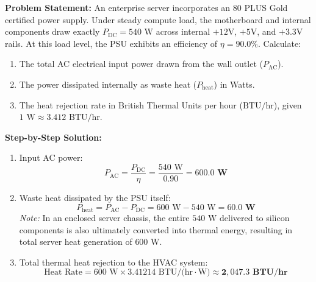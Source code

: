 \begin{tcolorbox}[colback=white,colframe=navyblue,title=\textbf{Problem 10: 80 PLUS PSU Efficiency and Thermal Heat Dissipation}]
\textbf{Problem Statement:} An enterprise server incorporates an 80 PLUS Gold certified power supply. Under steady compute load, the motherboard and internal components draw exactly $P_{\text{DC}} = 540\text{ W}$ across internal $+12\text{V}$, $+5\text{V}$, and $+3.3\text{V}$ rails. At this load level, the PSU exhibits an efficiency of $\eta = 90.0\%$. Calculate:
\begin{enumerate}[label=(\alph*),leftmargin=*]
    \item The total AC electrical input power drawn from the wall outlet ($P_{\text{AC}}$).
    \item The power dissipated internally as waste heat ($P_{\text{heat}}$) in Watts.
    \item The heat rejection rate in British Thermal Units per hour ($\text{BTU/hr}$), given $1\text{ W} \approx 3.412\text{ BTU/hr}$.
\end{enumerate}
\textbf{Step-by-Step Solution:}
\begin{enumerate}[label=(\alph*),leftmargin=*]
    \item Input AC power:
    \[
    P_{\text{AC}} = \frac{P_{\text{DC}}}{\eta} = \frac{540\text{ W}}{0.90} = \mathbf{600.0\text{ W}}
    \]
    \item Waste heat dissipated by the PSU itself:
    \[
    P_{\text{heat}} = P_{\text{AC}} - P_{\text{DC}} = 600\text{ W} - 540\text{ W} = \mathbf{60.0\text{ W}}
    \]
    \textit{Note:} In an enclosed server chassis, the entire $540\text{ W}$ delivered to silicon components is also ultimately converted into thermal energy, resulting in total server heat generation of $600\text{ W}$.
    \item Total thermal heat rejection to the HVAC system:
    \[
    \text{Heat Rate} = 600\text{ W} \times 3.41214\text{ BTU/(hr}\cdot\text{W)} \approx \mathbf{2,047.3\text{ BTU/hr}}
    \]
\end{enumerate}
\end{tcolorbox}

